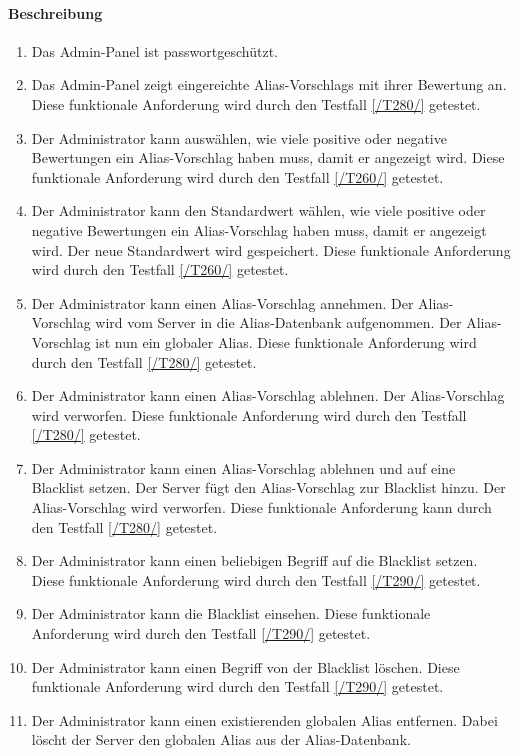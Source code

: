 \paragraph{Beschreibung}
\begin{enumerate}[start=101, label=\textbf{/FA\arabic*/}, align=left]
    \item Das \Gls{Admin-Panel} ist passwortgeschützt.
    \item \label{/FA102/} Das \Gls{Admin-Panel} zeigt eingereichte \Glspl{Alias-Vorschlag} mit ihrer Bewertung an. Diese funktionale Anforderung wird durch den Testfall \ref{/T280/} getestet.
    \item \label{/FA103/} Der \Gls{Administrator} kann auswählen, wie viele positive oder negative Bewertungen ein \Gls{Alias-Vorschlag} haben muss, damit er angezeigt wird. Diese funktionale Anforderung wird durch den Testfall \ref{/T260/} getestet.
    \item \label{/FA104/} Der \Gls{Administrator} kann den Standardwert wählen, wie viele positive oder negative Bewertungen ein \Gls{Alias-Vorschlag} haben muss, damit er angezeigt wird. Der neue Standardwert wird gespeichert. Diese funktionale Anforderung wird durch den Testfall \ref{/T260/} getestet.
    \item \label{/FA105/} Der \Gls{Administrator} kann einen \Gls{Alias-Vorschlag} annehmen. Der \Gls{Alias-Vorschlag} wird vom \Gls{Server} in die \Gls{Alias}-\Gls{Datenbank} aufgenommen. Der \Gls{Alias-Vorschlag} ist nun ein \gls{global}er \Gls{Alias}. Diese funktionale Anforderung wird durch den Testfall \ref{/T280/} getestet.
    \item \label{/FA106/} Der \Gls{Administrator} kann einen \Gls{Alias-Vorschlag} ablehnen. Der \Gls{Alias-Vorschlag} wird verworfen. Diese funktionale Anforderung wird durch den Testfall \ref{/T280/} getestet.
    \item \label{/FA107/} Der \Gls{Administrator} kann einen \Gls{Alias-Vorschlag} ablehnen und auf eine \Gls{Blacklist} setzen. Der \Gls{Server} fügt den {Alias-Vorschlag} zur \Gls{Blacklist} hinzu. Der \Gls{Alias-Vorschlag} wird verworfen. Diese funktionale Anforderung kann durch den Testfall \ref{/T280/} getestet.
    \item \label{/FA108/} Der \Gls{Administrator} kann einen beliebigen Begriff auf die \Gls{Blacklist} setzen. Diese funktionale Anforderung wird durch den Testfall \ref{/T290/} getestet.
    \item \label{/FA109/} Der \Gls{Administrator} kann die \Gls{Blacklist} einsehen. Diese funktionale Anforderung wird durch den Testfall \ref{/T290/} getestet.
    \item \label{/FA110/} Der \Gls{Administrator} kann einen Begriff von der \Gls{Blacklist} löschen. Diese funktionale Anforderung wird durch den Testfall \ref{/T290/} getestet.
    \item Der \Gls{Administrator} kann einen existierenden \gls{global}en \Gls{Alias} entfernen. Dabei löscht der \Gls{Server} den \gls{global}en \Gls{Alias} aus der \Gls{Alias}-\Gls{Datenbank}.
\end{enumerate}